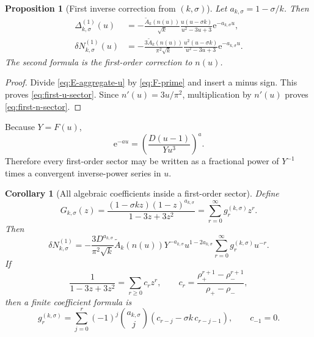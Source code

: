 \documentclass[11pt]{article}
\numberwithin{equation}{section}
\theoremstyle{mainthm}
\newtheorem{proposition}[theorem]{Proposition}
\newtheorem{corollary}[theorem]{Corollary}
\theoremstyle{defstyle}
\theoremstyle{remark}
\newcommand{\e}{\mathrm e}
\begin{document}
\begin{proposition}[First inverse correction from \((k,\sigma)\)]\label{prop:first-sector-inverse}
Let \(a_{k,\sigma}=1-\sigma/k\).  Then
\begin{align}
 \Delta_{k,\sigma}^{(1)}(u)
 &=-\frac{\widetilde A_k(n(u))}{\sqrt{k}}
 \frac{u(u-\sigma k)}{u^2-3u+3}
 \e^{-a_{k,\sigma}u},
 \label{eq:first-u-sector}\\
 \delta N_{k,\sigma}^{(1)}(u)
 &=-\frac{3\widetilde A_k(n(u))}{\pi^2\sqrt{k}}
 \frac{u^2(u-\sigma k)}{u^2-3u+3}
 \e^{-a_{k,\sigma}u}.
 \label{eq:first-n-sector}
\end{align}
The second formula is the first-order correction to \(n(u)\).
\end{proposition}

\begin{proof}
Divide \eqref{eq:E-aggregate-u} by \eqref{eq:F-prime} and insert a minus sign.  This proves \eqref{eq:first-u-sector}.  Since \(n'(u)=3u/\pi^2\), multiplication by \(n'(u)\) proves \eqref{eq:first-n-sector}.
\end{proof}

Because \(Y=F(u)\),
\begin{equation}\label{eq:exp-action-to-Y}
 \e^{-au}=\left(\frac{D(u-1)}{Yu^3}\right)^a.
\end{equation}
Therefore every first-order sector may be written as a fractional power of \(Y^{-1}\) times a convergent inverse-power series in \(u\).

\begin{corollary}[All algebraic coefficients inside a first-order sector]\label{cor:first-sector-algebraic}
Define
\begin{equation}\label{eq:g-generating}
 G_{k,\sigma}(z)=
 \frac{(1-\sigma kz)(1-z)^{a_{k,\sigma}}}{1-3z+3z^2}
 =\sum_{r=0}^{\infty}g_r^{(k,\sigma)}z^r.
\end{equation}
Then
\begin{equation}\label{eq:first-sector-Y-form}
 \boxed{
 \delta N_{k,\sigma}^{(1)}
 =-\frac{3D^{a_{k,\sigma}}}{\pi^2\sqrt{k}}
 \widetilde A_k(n(u))Y^{-a_{k,\sigma}}
 u^{1-2a_{k,\sigma}}
 \sum_{r=0}^{\infty}g_r^{(k,\sigma)}u^{-r}.}
\end{equation}
If
\begin{equation}\label{eq:c-r-def}
 \frac1{1-3z+3z^2}=\sum_{r\ge0}c_rz^r,
 \qquad
 c_r=\frac{\rho_+^{r+1}-\rho_-^{r+1}}{\rho_+-\rho_-},
\end{equation}
then a finite coefficient formula is
\begin{equation}\label{eq:g-r-finite}
 g_r^{(k,\sigma)}=
 \sum_{j=0}^{r}(-1)^j\binom{a_{k,\sigma}}j
 \left(c_{r-j}-\sigma k\,c_{r-j-1}\right),
 \qquad c_{-1}=0.
\end{equation}
\end{corollary}
\end{document}
